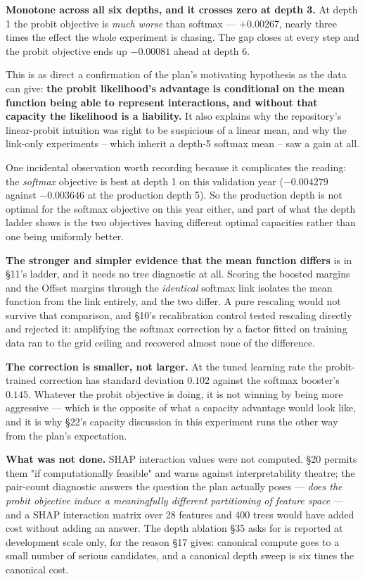 \textbf{Monotone across all six depths, and it crosses zero at depth 3.} At depth 1 the probit
objective is \emph{much worse} than softmax --- $+0.00267$, nearly three times the effect the
whole experiment is chasing. The gap closes at every step and the probit objective ends up
$-0.00081$ ahead at depth 6.

This is as direct a confirmation of the plan's motivating hypothesis as the data can give:
\textbf{the probit likelihood's advantage is conditional on the mean function being able to
represent interactions, and without that capacity the likelihood is a liability.} It also
explains why the repository's linear-probit intuition was right to be suspicious of a linear
mean, and why the link-only experiments -- which inherit a depth-5 softmax mean -- saw a gain at
all.

One incidental observation worth recording because it complicates the reading: the
\emph{softmax} objective is best at depth 1 on this validation year ($-0.004279$ against
$-0.003646$ at the production depth 5). So the production depth is not optimal for the softmax
objective on this year either, and part of what the depth ladder shows is the two objectives
having different optimal capacities rather than one being uniformly better.

\textbf{The stronger and simpler evidence that the mean function differs} is in §11's ladder, and
it needs no tree diagnostic at all. Scoring the boosted margins and the Offset margins through the
\emph{identical} softmax link isolates the mean function from the link entirely, and the two
differ. A pure rescaling would not survive that comparison, and §10's recalibration control tested
rescaling directly and rejected it: amplifying the softmax correction by a factor fitted on
training data ran to the grid ceiling and recovered almost none of the difference.

\textbf{The correction is smaller, not larger.} At the tuned learning rate the probit-trained
correction has standard deviation $0.102$ against the softmax booster's $0.145$. Whatever the
probit objective is doing, it is not winning by being more aggressive --- which is the opposite of
what a capacity advantage would look like, and it is why §22's capacity discussion in this
experiment runs the other way from the plan's expectation.

\textbf{What was not done.} SHAP interaction values were not computed. §20 permits them "if
computationally feasible" and warns against interpretability theatre; the pair-count diagnostic
answers the question the plan actually poses --- \emph{does the probit objective induce a
meaningfully different partitioning of feature space} --- and a SHAP interaction matrix over 28
features and 400 trees would have added cost without adding an answer. The depth ablation §35
asks for is reported at development scale only, for the reason §17 gives: canonical compute goes
to a small number of serious candidates, and a canonical depth sweep is six times the canonical
cost.
